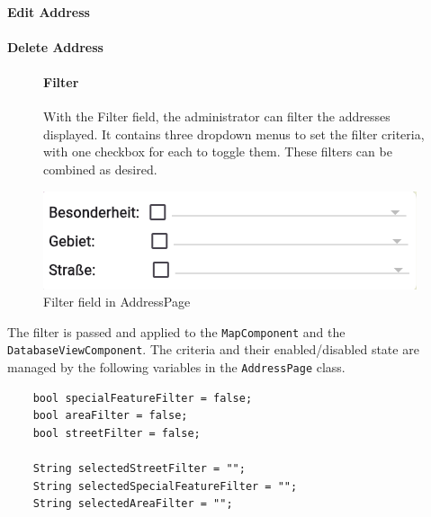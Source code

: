 \paragraph{Edit Address}

\paragraph{Delete Address}


\begin{figure}[H]
    \centering
    \begin{minipage}{0.55\textwidth} %
        \paragraph{Filter}
        With the Filter field, the administrator can filter the addresses displayed. It contains three dropdown menus to set the filter criteria, with one checkbox for each to toggle them. These filters can be combined as desired. 
    \end{minipage}
    \hfill 
    \begin{minipage}{0.4\textwidth} %
        \centering
        \includegraphics[width=\linewidth]{images/AdminPanel/FilterField.png}
        \caption{Filter field in AddressPage}
        \label{fig:adminpanel_filter}
    \end{minipage}
\end{figure}

The filter is passed and applied to the \texttt{MapComponent} and the \texttt{DatabaseViewComponent}. The criteria and their enabled/disabled state are managed by the following variables in the \texttt{AddressPage} class.
\lstset{style=mycsharp, caption=Filter variables in AddressPage}
\begin{lstlisting}
    bool specialFeatureFilter = false;
    bool areaFilter = false;
    bool streetFilter = false;
    
    String selectedStreetFilter = "";
    String selectedSpecialFeatureFilter = "";
    String selectedAreaFilter = "";
\end{lstlisting}

